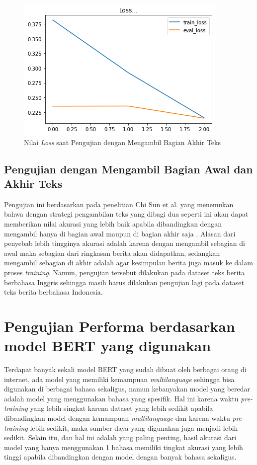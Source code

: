\begin{figure}[h!]
    \begin{center}
        \includegraphics[width= 0.9\linewidth]{gambar/loss_concat_akhir.png}
        \caption{Nilai \textit{Loss} saat Pengujian dengan Mengambil Bagian Akhir Teks}
        \label{fig: loss_const_akhir}
    \end{center}
\end{figure}

\subsection{Pengujian dengan Mengambil Bagian Awal dan Akhir Teks}

Pengujian ini berdasarkan pada penelitian Chi Sun et al. yang menemukan bahwa dengan strategi pengambilan teks yang dibagi dua seperti ini akan dapat memberikan nilai akurasi yang lebih baik apabila dibandingkan dengan mengambil hanya di bagian awal maupun di bagian akhir saja \cite{sun2019fine}. Alasan dari penyebab lebih tingginya akurasi adalah karena dengan mengambil sebagian di awal maka sebagian dari ringkasan berita akan didapatkan, sedangkan mengambil sebagian di akhir adalah agar kesimpulan berita juga masuk ke dalam proses \textit{training}. Namun, pengujian tersebut dilakukan pada dataset teks berita berbahasa Inggris sehingga masih harus dilakukan pengujian lagi pada dataset teks berita berbahasa Indonesia.

\section{Pengujian Performa berdasarkan model BERT yang digunakan}

Terdapat banyak sekali model BERT yang sudah dibuat oleh berbagai orang di internet, ada model yang memiliki kemampuan \textit{multilanguage} sehingga bisa digunakan di berbagai bahasa sekaligus, namun kebanyakan model yang beredar adalah model yang menggunakan bahasa yang spesifik. Hal ini karena waktu \textit{pre-training} yang lebih singkat karena dataset yang lebih sedikit apabila dibandingkan model dengan kemampuan \textit{multilanguage} dan karena waktu \textit{pre-training} lebih sedikit, maka sumber daya yang digunakan juga menjadi lebih sedikit. Selain itu, dan hal ini adalah yang paling penting, hasil akurasi dari model yang hanya menggunakan 1 bahasa memiliki tingkat akurasi yang lebih tinggi apabila dibandingkan dengan model dengan banyak bahasa sekaligus.

